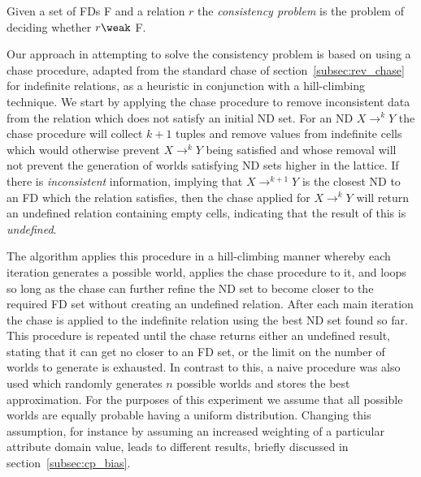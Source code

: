 \begin{definition}\label{def:cons}
\begin{rm}
Given a set of FDs F and a relation $r$ the {\em consistency problem}
is the problem of deciding whether $r \weak$ F. 
\end{rm}
\end{definition}


Our approach in attempting to solve the consistency problem is based on using
a chase procedure, adapted from the standard chase of
section~\ref{subsec:rev_chase} for indefinite relations, as a
heuristic in conjunction with a hill-climbing 
technique. We start by applying the chase procedure to remove
inconsistent data from the relation which does not satisfy an
initial ND set. For an ND $X \to^k Y$ the chase procedure will
collect $k + 1$ tuples and remove values from indefinite cells
which would otherwise prevent $X \to^k Y$ being satisfied and whose
removal will not prevent the generation of worlds satisfying ND sets
higher in the lattice.
If there is {\em inconsistent} information, implying that 
$X \to^{k+1} Y$ is
the closest ND to an FD which the relation satisfies, then the
chase applied for $X \to^k Y$ will return an undefined relation
containing empty cells, indicating that the result of this is {\em undefined}.

\smallskip

The algorithm applies this procedure in a hill-climbing manner
whereby each iteration generates a possible world, applies the
chase procedure to it, and loops so long as the chase can
further refine the ND set to become closer to the required FD set without
creating an undefined relation.
After each main iteration the chase is applied to the indefinite
relation using the best ND set found so far. This procedure is repeated until
the chase returns either an undefined result, stating that it can get no
closer to an FD set, or the limit on the number of worlds to
generate is exhausted.  In contrast to this, a naive procedure
was also used which randomly generates $n$ possible worlds and stores the best approximation.
For the purposes of this experiment we assume that all possible worlds
are equally probable having a uniform distribution. Changing this assumption,
for instance by assuming an increased weighting of a particular attribute 
domain value, leads to different results, briefly discussed in
section~\ref{subsec:cp_bias}. 

\smallskip

